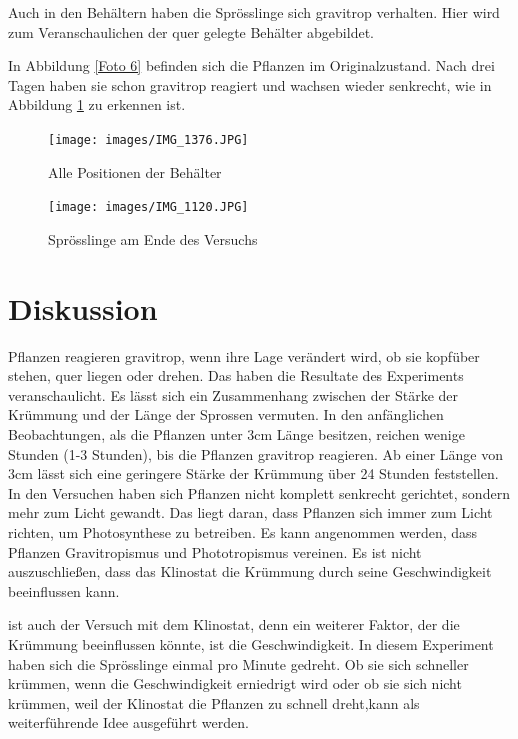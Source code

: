 \documentclass[
11pt, 
ngerman,
listof=totocnumbered,
oneside,
bibliography=totocnumbered,
abstracton
]{scrreprt}
\begin{document}
Auch in den Behältern haben die Sprösslinge sich gravitrop verhalten. Hier wird zum Veranschaulichen der quer gelegte Behälter abgebildet.

In Abbildung \ref{Foto 6} befinden sich die Pflanzen im Originalzustand. Nach drei Tagen haben sie schon gravitrop reagiert und wachsen wieder senkrecht, wie in Abbildung \ref{Foto 7} zu erkennen ist.

\begin{figure}[H]
	\centering 
	\texttt{[image: images/IMG\_1376.JPG]}
	\caption{Alle Positionen der Behälter}
\end{figure} 




\begin{figure}[H]
	\centering 
	\texttt{[image: images/IMG\_1120.JPG]}
	\caption{Sprösslinge am Ende des Versuchs \label{Foto 7}}
\end{figure} 


\section{Diskussion}

Pflanzen reagieren gravitrop, wenn ihre Lage verändert wird, ob sie kopfüber stehen, quer liegen oder drehen. Das haben die Resultate des Experiments  veranschaulicht. Es lässt sich ein Zusammenhang zwischen der Stärke der Krümmung und der Länge der Sprossen vermuten. In den anfänglichen Beobachtungen, als die Pflanzen unter 3cm Länge besitzen, reichen wenige Stunden (1-3 Stunden), bis die Pflanzen gravitrop reagieren. Ab einer Länge von 3cm lässt sich eine geringere Stärke der Krümmung über 24 Stunden feststellen.
In den Versuchen haben sich Pflanzen nicht komplett senkrecht gerichtet, sondern mehr zum Licht gewandt. Das liegt daran, dass Pflanzen sich immer zum Licht richten, um Photosynthese zu betreiben. Es kann angenommen werden, dass Pflanzen Gravitropismus und Phototropismus vereinen.
Es ist nicht auszuschließen, dass das Klinostat die Krümmung durch seine Geschwindigkeit beeinflussen kann.

  ist auch der Versuch mit dem Klinostat, denn ein weiterer Faktor, der die Krümmung beeinflussen könnte, ist die Geschwindigkeit. In diesem Experiment haben sich die Sprösslinge einmal pro Minute gedreht. Ob sie sich schneller krümmen, wenn die Geschwindigkeit erniedrigt wird oder ob sie sich nicht krümmen, weil der Klinostat die Pflanzen zu schnell dreht,kann als weiterführende Idee ausgeführt werden.
\end{document}
